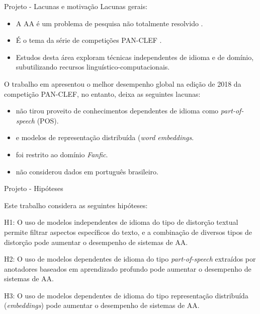 \begin{frame}{Projeto - Lacunas e motivação}
	Lacunas gerais:
	
	\begin{itemize}
		\item A AA é um problema de pesquisa não totalmente resolvido \cite{Potthast2017}.
		\item É o tema da série de competições PAN-CLEF \cite{aa-overview-2018}.
		\item Estudos desta área exploram técnicas independentes de idioma e de domínio, subutilizando  recursos linguístico-computacionais.
	\end{itemize}
	
	O trabalho em  apresentou o melhor desempenho global na edição de 2018 da competição PAN-CLEF, no entanto, deixa as seguintes lacunas:
	\begin{itemize}
		\item não tirou proveito de conhecimentos dependentes de idioma como {\it part-of-speech} (POS).
		\item e modelos de representação distribuída ({\it word embeddings}.
		\item foi restrito ao domínio {\it Fanfic}.
		\item não considerou dados em português brasileiro.
	\end{itemize}

\end{frame}

\begin{frame} {Projeto - Hipóteses}

	Este trabalho considera as seguintes hipóteses:
	
	\begin{block}{H1:} O uso de modelos independentes de idioma do tipo de distorção textual permite filtrar aspectos específicos do texto, e a combinação de diversos tipos de distorção pode aumentar o desempenho de sistemas de AA.
	\end{block}
	
	\begin{block}{H2:} O uso de modelos dependentes de idioma do tipo {\it part-of-speech} extraídos por anotadores baseados em aprendizado profundo pode aumentar o desempenho de sistemas de AA.
	\end{block}
	
	
	\begin{block}{H3:} O uso de modelos dependentes de idioma do tipo representação distribuída ({\it embeddings}) pode aumentar o desempenho de sistemas de AA.
	\end{block}

\end{frame}

